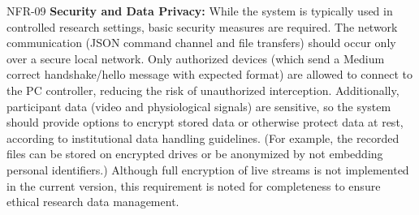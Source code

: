 \documentclass[11pt,a4paper]{report}
\begin{document}
  NFR-09 \textbf{Security and Data Privacy:} While the system is typically used in
  controlled research settings, basic security measures are required.  The network
  communication (JSON command channel and file transfers) should occur only over a
  secure local network.  Only authorized devices (which send a Medium
                          correct handshake/hello message with expected format) are
                          allowed to connect to the PC controller, reducing the risk
                          of unauthorized interception.  Additionally, participant
                          data (video and physiological signals) are sensitive, so
                          the system should provide options to encrypt stored data or
                          otherwise protect data at rest, according to institutional
                          data handling guidelines.  (For example, the recorded files
                          can be stored on encrypted drives or be anonymized by not
                          embedding personal identifiers.) Although full encryption
                          of live streams is not implemented in the current version,
                          this requirement is noted for completeness to ensure
                          ethical research data management.
\end{document}
